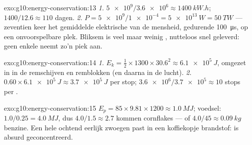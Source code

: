 \begin{solution}{exo:g10:energy-conservation:13}
\emph{1.} $\num{5e9}/\num{3.6e6} \approx \qty{1400}{kW.h}$;
$1400/12.6 \approx 110$ dagen.
\emph{2.} $P = \num{5e9}/\num{1e-4} = \qty{5e13}{W} = \qty{50}{TW}$ ---
zeventien keer het gemiddelde elektrische  van de mensheid,
gedurende \qty{100}{\micro s}, op een onvoorspelbare plek. Bliksem is
veel  maar weinig , nutteloos snel geleverd: geen enkele
 neemt zo'n piek aan.
\end{solution}

\begin{solution}{exo:g10:energy-conservation:14}
\emph{1.} $E_k = \tfrac12 \times 1300 \times 30.6^2 \approx
\qty{6.1e5}{J}$, omgezet in  in de remschijven en
remblokken (en daarna in de lucht).
\emph{2.} $0.60 \times \qty{6.1e5}{J} \approx \qty{3.7e5}{J}$ per stop;
$\num{3.6e6}/\num{3.7e5} \approx 10$ stops per .
\end{solution}

\begin{solution}{exo:g10:energy-conservation:15}
$E_p = 85 \times 9.81 \times 1200 \approx \qty{1.0}{MJ}$; voedsel:
$1.0/0.25 = \qty{4.0}{MJ}$, dus $4.0/1.5 \approx 2.7$ kommen cornflakes
--- of $4.0/45 \approx \qty{0.09}{kg}$ benzine. Een hele ochtend eerlijk
zwoegen past in een koffiekopje brandstof:  is absurd
geconcentreerd.
\end{solution}

